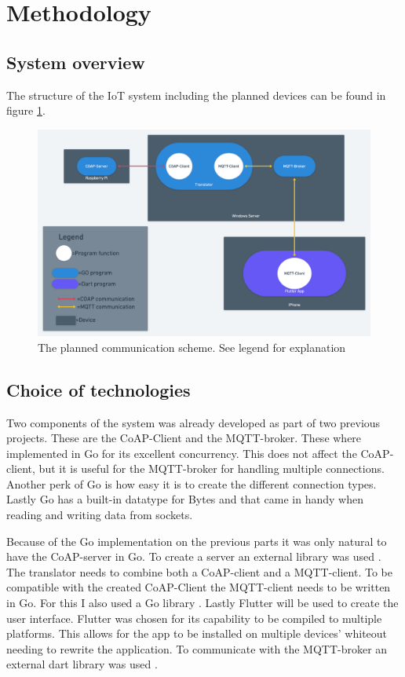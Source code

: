 \section{Methodology}
\label{ch:method}
\noindent	


\subsection{System overview}
\label{ch:method:model}
The structure of the IoT system including the planned devices can be found in figure \ref{fig:communication}. 
\begin{figure}[H]
    \centering
    \includegraphics[width=1\textwidth]{img/communication.png} 
    \caption{The planned communication scheme. See legend for explanation}
    \label{fig:communication}
\end{figure}


\subsection{Choice of technologies}
\label{ch:method:tech}
Two components of the system was already developed as part of two previous projects. These are the CoAP-Client and the MQTT-broker. These where implemented in Go for its excellent concurrency. This does not affect the CoAP-client, but it is useful for the MQTT-broker for handling multiple connections. Another perk of Go is how easy it is to create the different connection types. Lastly Go has a built-in datatype for Bytes and that came in handy when reading and writing data from sockets. 

Because of the Go implementation on the previous parts it was only natural to have the CoAP-server in Go. To create a server an external library was used \cite{goCOAP}. The translator needs to combine both a CoAP-client and a MQTT-client. To be compatible with the created CoAP-Client the MQTT-client needs to be written in Go. For this I also used a Go library \cite{goMQTT}. Lastly Flutter will be used to create the user interface. Flutter was chosen for its capability to be compiled to multiple platforms. This allows for the app to be installed on multiple devices' whiteout needing to rewrite the application. To communicate with the MQTT-broker an external dart library was used \cite{dartMqtt}.

